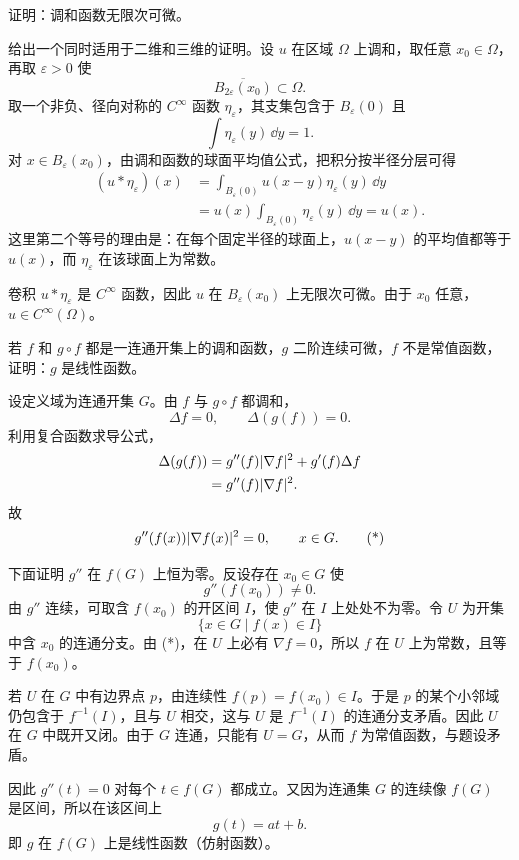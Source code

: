 \begin{xexercise}[7]
证明：调和函数无限次可微。
\end{xexercise}
\begin{xsolution}
给出一个同时适用于二维和三维的证明。设 $u$ 在区域 $\Omega$ 上调和，取任意 $x_0\in\Omega$，再取 $\varepsilon>0$ 使
\[
  \overline{B_{2\varepsilon}(x_0)}\subset\Omega.
\]
取一个非负、径向对称的 $C^\infty$ 函数 $\eta_\varepsilon$，其支集包含于 $B_\varepsilon(0)$ 且
\[
  \int\eta_\varepsilon(y)\,\dd y=1.
\]
对 $x\in B_\varepsilon(x_0)$，由调和函数的球面平均值公式，把积分按半径分层可得
\begin{align*}
  (u*\eta_\varepsilon)(x)
  &=\int_{B_\varepsilon(0)}u(x-y)\eta_\varepsilon(y)\,\dd y\\
  &=u(x)\int_{B_\varepsilon(0)}\eta_\varepsilon(y)\,\dd y
  =u(x).
\end{align*}
这里第二个等号的理由是：在每个固定半径的球面上，$u(x-y)$ 的平均值都等于 $u(x)$，而 $\eta_\varepsilon$ 在该球面上为常数。

卷积 $u*\eta_\varepsilon$ 是 $C^\infty$ 函数，因此 $u$ 在 $B_\varepsilon(x_0)$ 上无限次可微。由于 $x_0$ 任意，$u\in C^\infty(\Omega)$。
\end{xsolution}


\begin{xexercise}[8]
若 $f$ 和 $g\circ f$ 都是一连通开集上的调和函数，$g$ 二阶连续可微，$f$ 不是常值函数，证明：$g$ 是线性函数。
\end{xexercise}
\begin{xsolution}
设定义域为连通开集 $G$。由 $f$ 与 $g\circ f$ 都调和，
\[
  \Delta f=0,
  \qquad
  \Delta(g(f))=0.
\]
利用复合函数求导公式，
\begin{align*}
  \Delta(g(f))
  &=g''(f)\lvert\nabla f\rvert^2+g'(f)\Delta f\\
  &=g''(f)\lvert\nabla f\rvert^2.
\end{align*}
故
\begin{equation}
  g''(f(x))\lvert\nabla f(x)\rvert^2=0,
  \qquad x\in G.
  \tag{*}
\end{equation}

下面证明 $g''$ 在 $f(G)$ 上恒为零。反设存在 $x_0\in G$ 使
\[
  g''(f(x_0))\ne0.
\]
由 $g''$ 连续，可取含 $f(x_0)$ 的开区间 $I$，使 $g''$ 在 $I$ 上处处不为零。令 $U$ 为开集
\[
  \{x\in G\mid f(x)\in I\}
\]
中含 $x_0$ 的连通分支。由 (*)，在 $U$ 上必有 $\nabla f=0$，所以 $f$ 在 $U$ 上为常数，且等于 $f(x_0)$。

若 $U$ 在 $G$ 中有边界点 $p$，由连续性 $f(p)=f(x_0)\in I$。于是 $p$ 的某个小邻域仍包含于 $f^{-1}(I)$，且与 $U$ 相交，这与 $U$ 是 $f^{-1}(I)$ 的连通分支矛盾。因此 $U$ 在 $G$ 中既开又闭。由于 $G$ 连通，只能有 $U=G$，从而 $f$ 为常值函数，与题设矛盾。

因此 $g''(t)=0$ 对每个 $t\in f(G)$ 都成立。又因为连通集 $G$ 的连续像 $f(G)$ 是区间，所以在该区间上
\[
  g(t)=at+b.
\]
即 $g$ 在 $f(G)$ 上是线性函数（仿射函数）。
\end{xsolution}


